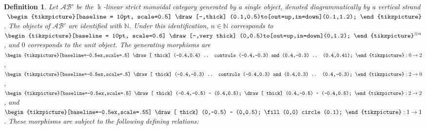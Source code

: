 \documentclass[a4,10pt]{amsart}
\numberwithin{equation}{section}
\newtheorem{Defn}[Theorem]{Definition}
\theoremstyle{definition}
\begin{document}
\begin{Defn} \label{C defn}
Let  $\mathcal {AB}'$ be the $\Bbbk$-linear strict monoidal category generated by a single object, denoted diagrammatically by a vertical strand
$\ \begin{tikzpicture}[baseline = 10pt, scale=0.5] 
	\draw[-,thick] (0.1,0.5)to[out=up,in=down](0.1,1.2);
\end{tikzpicture}$.
The objects of $\mathcal {AB}'$ are identified with $\mathbb N$. Under this identification,  $n\in\mathbb N$ corresponds to $
\begin{tikzpicture}[baseline = 10pt, scale=0.6]
	\draw[-,very thick] (0,0.5)to[out=up,in=down](0,1.2);
\end{tikzpicture}^{\otimes n}$, and $0$ corresponds to the unit object.
The generating morphisms are $\begin{tikzpicture}[baseline=-0.5ex,scale=.5]
		\draw[ thick] (-0.4,0.4) .. controls (-0.4,-0.3) and (0.4,-0.3) .. (0.4,0.41);
	\end{tikzpicture}
	: 0 \to 2$,
	$	\begin{tikzpicture}[baseline=-0.5ex,scale=.5]
		\draw[ thick] (-0.4,-0.3) .. controls (-0.4,0.3) and (0.4,0.3) .. (0.4,-0.3);
	\end{tikzpicture}
	: 2 \to 0$,
$	\begin{tikzpicture}[baseline=-0.5ex,scale=.5]
		\draw[ thick] (-0.4,-0.5) -- (0.4,0.5);
		\draw[ thick] (0.4,-0.5) -- (-0.4,0.5);
	\end{tikzpicture}
	: 2 \to 2$, and $
	\begin{tikzpicture}[baseline=-0.5ex,scale=.55]
		\draw[ thick] (0,-0.5) -- (0,0.5);
		\fill (0,0) circle (0.1);
	\end{tikzpicture}
	: 1 \to 1 $.
These morphisms   are subject to the following defining relations:
\end{Defn}
\end{document}
